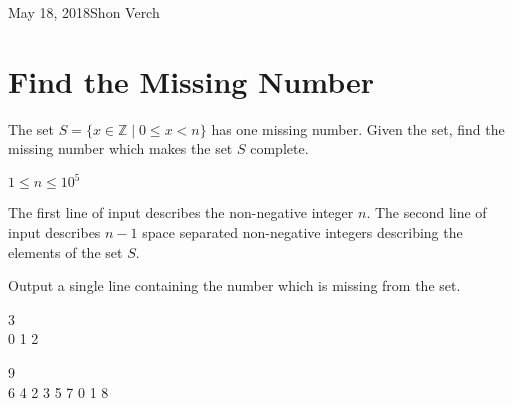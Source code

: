 

             {May 18, 2018}{Shon Verch}


\makeHeader

\section{Find the Missing Number}
The set $S = \{x \in \mathbb{Z} \mid 0 \le x < n\}$ has one missing number. Given the set, find the missing number which makes the set $S$ complete.

\constraints
$1 \leq n \leq 10^5$

The first line of input describes the non-negative integer $n$. The second line of input describes $n-1$ space separated non-negative integers describing the elements of the set $S$.

\outputformat
Output a single line containing the number which is missing from the set.

\vspace{1em}

\addsample
{
3\\
0 1
}
{
2
}

\pushnewpage

\addsample
{
9\\
6 4 2 3 5 7 0 1
}
{
8
}
